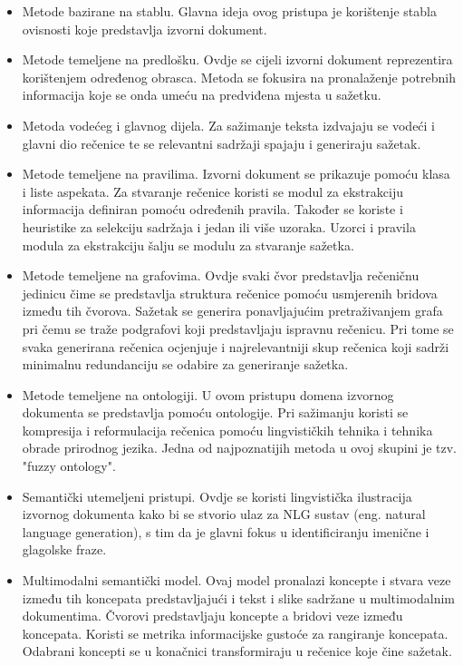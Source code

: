 \documentclass[times, utf8, zavrsni, numeric]{fer}
\begin{document}
\begin{itemize}
    \item Metode bazirane na stablu. Glavna ideja ovog pristupa je korištenje stabla ovisnosti koje predstavlja izvorni dokument.
    \item Metode temeljene na predlošku. Ovdje se cijeli izvorni dokument reprezentira korištenjem određenog obrasca. Metoda se fokusira na pronalaženje potrebnih informacija koje se onda umeću na predviđena mjesta u sažetku.
    \item Metoda vodećeg i glavnog dijela. Za sažimanje teksta izdvajaju se vodeći i glavni dio rečenice te se relevantni sadržaji spajaju i generiraju sažetak.
    \item Metode temeljene na pravilima. Izvorni dokument se prikazuje pomoću klasa i liste aspekata. Za stvaranje rečenice koristi se modul za ekstrakciju informacija definiran pomoću određenih pravila. Također se koriste i heuristike za selekciju sadržaja i jedan ili više uzoraka. Uzorci i pravila modula za ekstrakciju šalju se modulu za stvaranje sažetka.
    \item Metode temeljene na grafovima. Ovdje svaki čvor predstavlja rečeničnu jedinicu čime se predstavlja struktura rečenice pomoću usmjerenih bridova između tih čvorova. Sažetak se generira ponavljajućim pretraživanjem grafa pri čemu se traže podgrafovi koji predstavljaju ispravnu rečenicu. Pri tome se svaka generirana rečenica ocjenjuje i najrelevantniji skup rečenica koji sadrži minimalnu redundanciju se odabire za generiranje sažetka.
    \item Metode temeljene na ontologiji. U ovom pristupu domena izvornog dokumenta se predstavlja pomoću ontologije. Pri sažimanju koristi se kompresija i reformulacija rečenica pomoću lingvističkih tehnika i tehnika obrade prirodnog jezika. Jedna od najpoznatijih metoda u ovoj skupini je tzv. "fuzzy ontology".
    \item Semantički utemeljeni pristupi. Ovdje se koristi lingvistička ilustracija izvornog dokumenta kako bi se stvorio ulaz za NLG sustav (eng. natural language generation), s tim da je glavni fokus u identificiranju imenične i glagolske fraze.
    \item Multimodalni semantički model. Ovaj model pronalazi koncepte i stvara veze između tih koncepata predstavljajući i tekst i slike sadržane u multimodalnim dokumentima. Čvorovi predstavljaju koncepte a bridovi veze između koncepata. Koristi se metrika informacijske gustoće za rangiranje koncepata. Odabrani koncepti se u konačnici transformiraju u rečenice koje čine sažetak.

\end{itemize}
\end{document}
